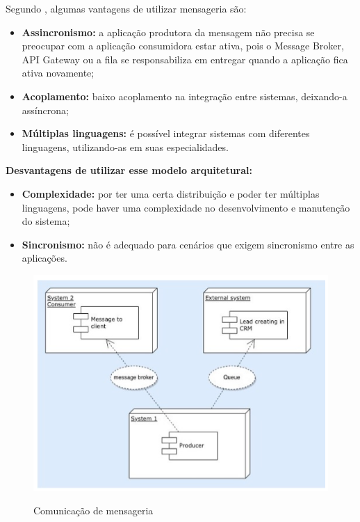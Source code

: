 Segundo \cite{LewisFowler}, algumas vantagens de utilizar mensageria são:

\begin{itemize}
    \item \textbf{Assincronismo:} a aplicação produtora da mensagem não precisa se preocupar com a aplicação consumidora estar ativa, pois o Message Broker, API Gateway ou a fila se responsabiliza em entregar quando a aplicação fica ativa novamente;
    \item \textbf{Acoplamento:} baixo acoplamento na integração entre sistemas, deixando-a assíncrona;
    \item \textbf{Múltiplas linguagens:} é possível integrar sistemas com diferentes linguagens, utilizando-as em suas especialidades.
\end{itemize}

\textbf{Desvantagens de utilizar esse modelo arquitetural:}

\begin{itemize}
    \item \textbf{Complexidade:} por ter uma certa distribuição e poder ter múltiplas linguagens, pode haver uma complexidade no desenvolvimento e manutenção do sistema;
    \item \textbf{Sincronismo:} não é adequado para cenários que exigem sincronismo entre as aplicações.
\end{itemize}

\begin{figure}[!ht]
    \centering
    \caption{Comunicação de mensageria}
    \includegraphics[scale=0.44]{assets/message-communication}
    \label{fig:message-communication}
    \tiny
    \sourcemedaddy
\end{figure}

